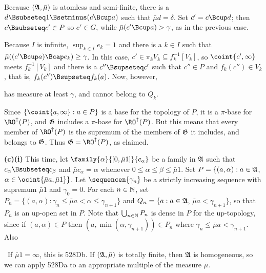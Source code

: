 {\noindent Because $(\frak A,\bar\mu)$ is atomless and semi-finite,
there is a $d\Bsubseteq 1\Bsetminus(c\Bcup a)$ such that
$\bar\mu d=\delta$.   Set $c'=c\Bcup d$;  then $c\Bsubseteq c'\in P$ so
$c'\in G$, while $\bar\mu(c'\Bcup a)>\gamma$, as in the previous case.

Because $I$ is infinite, $\sup_{k\in I}e_k=1$ and
there is a $k\in I$
such that $\bar\mu((c'\Bcup a)\Bcap e_k)\ge\gamma$.   In this case,
$c'\in\pi_kV_k\subseteq\overline{f_k^{-1}[V_k]}$, so
$\coint{c',\infty}$ meets $f_k^{-1}[V_k]$ and there is a
$c''\Bsupseteq c'$ such that $c''\in P$ and $f_k(c'')\in V_k$, that is,
$f_k(c'')\Bsupseteq f_k(a)$.   Now, however,


\noindent has measure at least $\gamma$, and cannot belong to
$Q_k$.\ \Bang\Qed


\medskip

 Since $\{\coint{a,\infty}:a\in P\}$ is a base for the
topology of $P$, it is a $\pi$-base for $\RO^{\uparrow}(P)$, and
$\frak G$ includes a $\pi$-base  for $\RO^{\uparrow}(P)$.   But this means
that every member of $\RO^{\uparrow}(P)$ is the supremum of the members of
$\frak G$ it includes, and belongs to $\frak G$.   Thus
$\frak G=\RO^{\uparrow}(P)$, as claimed.

\medskip

{\bf (c)(i)} This time, let
$\family{\alpha}{[0,\bar\mu 1]}{c_{\alpha}}$ be a family in $\frak A$ such
that $c_{\alpha}\Bsubseteq c_{\beta}$ and $\bar\mu c_{\alpha}=\alpha$
whenever $0\le\alpha\le\beta\le\bar\mu 1$.
Set $P=\{(a,\alpha):a\in\frak A$, $\alpha\in\ocint{\bar\mu a,\bar\mu 1}\}$.
Let $\sequencen{\gamma_n}$ be a strictly increasing sequence with
supremum $\bar\mu 1$ and $\gamma_0=0$.   For each $n\in\Bbb N$, set
$P_n=\{(a,\alpha):\gamma_n\le\bar\mu a<\alpha\le\gamma_{n+1}\}$ and
$Q_n=\{a:a\in\frak A$, $\bar\mu a<\gamma_{n+1}\}$, so that $P_n$ is an
up-open set in $P$.
Note that $\bigcup_{n\in\Bbb N}P_n$ is dense in $P$ for the up-topology,
since if $(a,\alpha)\in P$ then $(a,\min(\alpha,\gamma_{n+1}))\in P_n$
where $\gamma_n\le\bar\mu a<\gamma_{n+1}$.   Also


\noindent\Prf\ If $\bar\mu 1=\infty$, this is 528Db.   If
$(\frak A,\bar\mu)$ is totally finite, then $\frak A$ is homogeneous, so
we can apply 528Da to an appropriate multiple of the measure $\bar\mu$.\
\Qed

}
